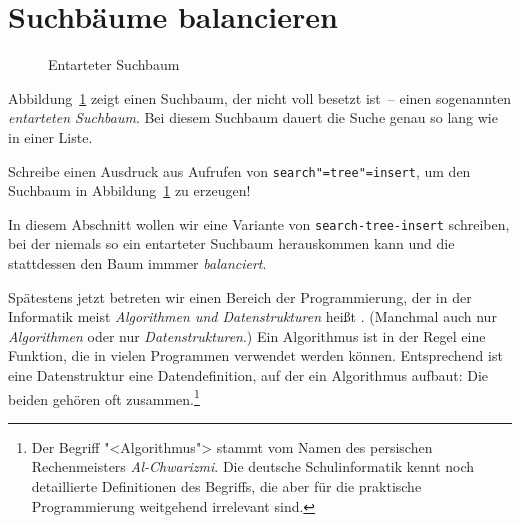 \section{Suchbäume balancieren}
\label{sec:balancierte-suchbaeume}

\begin{figure}[tb]
  \caption{Entarteter Suchbaum}
  \label{fig:degenerated-searchtree}
\end{figure}

Abbildung~\ref{fig:degenerated-searchtree} zeigt einen Suchbaum, der
nicht voll besetzt ist~-- einen sogenannten \textit{entarteten
  Suchbaum}. Bei
diesem Suchbaum dauert die Suche genau so lang wie in einer Liste.
%
\begin{aufgabeinline}
  Schreibe einen Ausdruck aus Aufrufen von
  \texttt{search"=tree"=insert}, um den Suchbaum in
  Abbildung~\ref{fig:degenerated-searchtree} zu erzeugen!
\end{aufgabeinline}
%
In diesem Abschnitt wollen wir eine Variante von
\lstinline{search-tree-insert} schreiben, bei der niemals so ein
entarteter Suchbaum herauskommen kann und die stattdessen den Baum
immmer \textit{balanciert}.

Spätestens jetzt betreten wir einen Bereich der Programmierung, der in
der Informatik meist \textit{Algorithmen und Datenstrukturen} heißt
\cite{BirdGibbons2020}.
(Manchmal auch nur \textit{Algorithmen} oder nur
\textit{Datenstrukturen}.)  Ein Algorithmus ist in der Regel eine
Funktion, die in vielen Programmen verwendet werden können.
Entsprechend ist eine Datenstruktur eine Datendefinition, auf der ein
Algorithmus aufbaut: Die beiden gehören oft zusammen.\footnote{Der
  Begriff "<Algorithmus"> stammt vom Namen des persischen
  Rechenmeisters \textit{Al-Chwarizmi}.  Die deutsche Schulinformatik
  kennt noch detaillierte Definitionen des Begriffs, die aber für die
  praktische Programmierung weitgehend irrelevant sind.}


